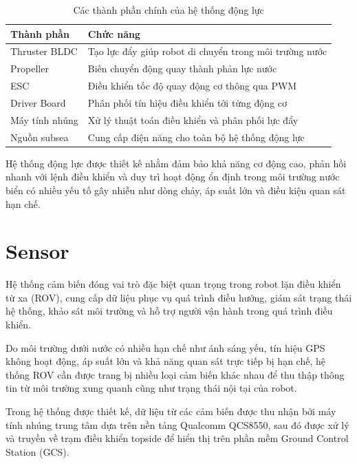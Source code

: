 \documentclass[../DoAn.tex]{subfiles}
\begin{document}
\begin{table}[H]
\centering
\caption{Các thành phần chính của hệ thống động lực}
\label{tab:propulsion_system}
\begin{tabular}{|p{4cm}|p{9cm}|}
\hline
\textbf{Thành phần} & \textbf{Chức năng} \\ \hline

Thruster BLDC &
Tạo lực đẩy giúp robot di chuyển trong môi trường nước \\ \hline

Propeller &
Biến chuyển động quay thành phản lực nước \\ \hline

ESC &
Điều khiển tốc độ quay động cơ thông qua PWM \\ \hline

Driver Board &
Phân phối tín hiệu điều khiển tới từng động cơ \\ \hline

Máy tính nhúng &
Xử lý thuật toán điều khiển và phân phối lực đẩy \\ \hline

Nguồn subsea &
Cung cấp điện năng cho toàn bộ hệ thống động lực \\ \hline

\end{tabular}
\end{table}

Hệ thống động lực được thiết kế nhằm đảm bảo khả năng cơ động cao, phản hồi nhanh với lệnh điều khiển và duy trì hoạt động ổn định trong môi trường nước biển có nhiều yếu tố gây nhiễu như dòng chảy, áp suất lớn và điều kiện quan sát hạn chế.

\section{Sensor}
\label{section:2.4}

Hệ thống cảm biến đóng vai trò đặc biệt quan trọng trong robot lặn điều khiển từ xa (ROV), cung cấp dữ liệu phục vụ quá trình điều hướng, giám sát trạng thái hệ thống, khảo sát môi trường và hỗ trợ người vận hành trong quá trình điều khiển. 

Do môi trường dưới nước có nhiều hạn chế như ánh sáng yếu, tín hiệu GPS không hoạt động, áp suất lớn và khả năng quan sát trực tiếp bị hạn chế, hệ thống ROV cần được trang bị nhiều loại cảm biến khác nhau để thu thập thông tin từ môi trường xung quanh cũng như trạng thái nội tại của robot.

Trong hệ thống được thiết kế, dữ liệu từ các cảm biến được thu nhận bởi máy tính nhúng trung tâm dựa trên nền tảng 
Qualcomm QCS8550,
sau đó được xử lý và truyền về trạm điều khiển topside để hiển thị trên phần mềm Ground Control Station (GCS).
\end{document}
